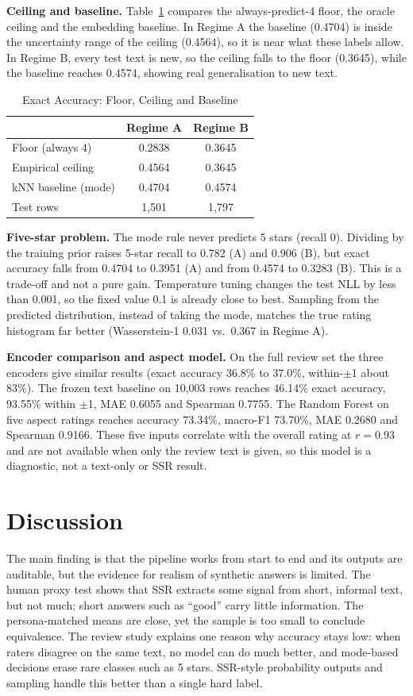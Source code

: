 \documentclass[conference]{IEEEtran}
\begin{document}
\textbf{Ceiling and baseline.} Table~\ref{tab:ceiling} compares the always-predict-4 floor, the oracle ceiling and the embedding baseline. In Regime A the baseline (0.4704) is inside the uncertainty range of the ceiling (0.4564), so it is near what these labels allow. In Regime B, every test text is new, so the ceiling falls to the floor (0.3645), while the baseline reaches 0.4574, showing real generalisation to new text.

\begin{table}[t]
\caption{Exact Accuracy: Floor, Ceiling and Baseline}
\label{tab:ceiling}
\centering
\small
\begin{tabular}{@{}lcc@{}}
\toprule
 & Regime A & Regime B \\
\midrule
Floor (always 4) & 0.2838 & 0.3645 \\
Empirical ceiling & 0.4564 & 0.3645 \\
kNN baseline (mode) & 0.4704 & 0.4574 \\
Test rows & 1,501 & 1,797 \\
\bottomrule
\end{tabular}
\end{table}

\textbf{Five-star problem.} The mode rule never predicts 5 stars (recall 0). Dividing by the training prior raises 5-star recall to 0.782 (A) and 0.906 (B), but exact accuracy falls from 0.4704 to 0.3951 (A) and from 0.4574 to 0.3283 (B). This is a trade-off and not a pure gain. Temperature tuning changes the test NLL by less than 0.001, so the fixed value 0.1 is already close to best. Sampling from the predicted distribution, instead of taking the mode, matches the true rating histogram far better (Wasserstein-1 0.031 vs.\ 0.367 in Regime A).

\textbf{Encoder comparison and aspect model.} On the full review set the three encoders give similar results (exact accuracy 36.8\% to 37.0\%, within-$\pm$1 about 83\%). The frozen text baseline on 10,003 rows reaches 46.14\% exact accuracy, 93.55\% within $\pm$1, MAE 0.6055 and Spearman 0.7755. The Random Forest on five aspect ratings reaches accuracy 73.34\%, macro-F1 73.70\%, MAE 0.2680 and Spearman 0.9166. These five inputs correlate with the overall rating at $r=0.93$ and are not available when only the review text is given, so this model is a diagnostic, not a text-only or SSR result.

\section{Discussion}
The main finding is that the pipeline works from start to end and its outputs are auditable, but the evidence for realism of synthetic answers is limited. The human proxy test shows that SSR extracts some signal from short, informal text, but not much; short answers such as ``good'' carry little information. The persona-matched means are close, yet the sample is too small to conclude equivalence. The review study explains one reason why accuracy stays low: when raters disagree on the same text, no model can do much better, and mode-based decisions erase rare classes such as 5 stars. SSR-style probability outputs and sampling handle this better than a single hard label.
\end{document}
